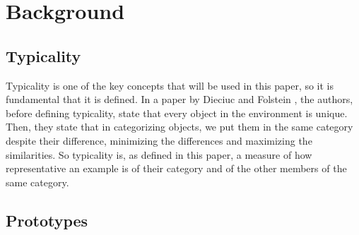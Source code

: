 \documentclass[conference]{IEEEtran}
\begin{document}
	\section{Background}
	
		\subsection{Typicality}
		
			\noindent Typicality is one of the key concepts that will be used in this paper, so it is fundamental that it is defined. In a paper by Dieciuc and Folstein \cite{dieciuc2019typicality},
			the authors, before defining typicality, state that every object in the environment is unique. Then, they state that in categorizing objects, we put them in the same category 
			despite their difference, minimizing the differences and maximizing the similarities. So typicality is, as defined in this paper, a measure of how representative 
			an example is of their category and of the other members of the same category. 
		
		\subsection{Prototypes}
\end{document}
